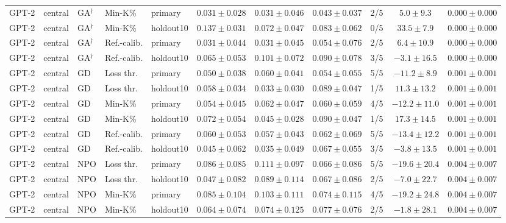 {\begin{longtable}{@{\extracolsep{\fill}}lllllcccccc@{}}
GPT-2 & central & GA$^{\dagger}$ & Min-K\% & primary & $0.031 \pm 0.028$ & $0.031 \pm 0.046$ & $0.043 \pm 0.037$ & 2/5 & $5.0 \pm 9.3$ & $0.000 \pm 0.000$ \\
GPT-2 & central & GA$^{\dagger}$ & Min-K\% & holdout10 & $0.137 \pm 0.031$ & $0.072 \pm 0.047$ & $0.083 \pm 0.062$ & 0/5 & $33.5 \pm 7.9$ & $0.000 \pm 0.000$ \\
GPT-2 & central & GA$^{\dagger}$ & Ref.-calib. & primary & $0.031 \pm 0.044$ & $0.031 \pm 0.045$ & $0.054 \pm 0.076$ & 2/5 & $6.4 \pm 10.9$ & $0.000 \pm 0.000$ \\
GPT-2 & central & GA$^{\dagger}$ & Ref.-calib. & holdout10 & $0.065 \pm 0.053$ & $0.101 \pm 0.072$ & $0.090 \pm 0.078$ & 3/5 & $-3.1 \pm 16.5$ & $0.000 \pm 0.000$ \\
GPT-2 & central & GD & Loss thr. & primary & $0.050 \pm 0.038$ & $0.060 \pm 0.041$ & $0.054 \pm 0.055$ & 5/5 & $-11.2 \pm 8.9$ & $0.001 \pm 0.001$ \\
GPT-2 & central & GD & Loss thr. & holdout10 & $0.058 \pm 0.034$ & $0.033 \pm 0.030$ & $0.089 \pm 0.047$ & 1/5 & $11.3 \pm 13.2$ & $0.001 \pm 0.001$ \\
GPT-2 & central & GD & Min-K\% & primary & $0.054 \pm 0.045$ & $0.062 \pm 0.047$ & $0.060 \pm 0.059$ & 4/5 & $-12.2 \pm 11.0$ & $0.001 \pm 0.001$ \\
GPT-2 & central & GD & Min-K\% & holdout10 & $0.072 \pm 0.054$ & $0.045 \pm 0.028$ & $0.090 \pm 0.047$ & 1/5 & $17.3 \pm 14.5$ & $0.001 \pm 0.001$ \\
GPT-2 & central & GD & Ref.-calib. & primary & $0.060 \pm 0.053$ & $0.057 \pm 0.043$ & $0.062 \pm 0.069$ & 5/5 & $-13.4 \pm 12.2$ & $0.001 \pm 0.001$ \\
GPT-2 & central & GD & Ref.-calib. & holdout10 & $0.045 \pm 0.062$ & $0.035 \pm 0.049$ & $0.067 \pm 0.055$ & 3/5 & $-3.8 \pm 13.5$ & $0.001 \pm 0.001$ \\
GPT-2 & central & NPO & Loss thr. & primary & $0.086 \pm 0.085$ & $0.111 \pm 0.097$ & $0.066 \pm 0.086$ & 5/5 & $-19.6 \pm 20.4$ & $0.004 \pm 0.007$ \\
GPT-2 & central & NPO & Loss thr. & holdout10 & $0.047 \pm 0.082$ & $0.089 \pm 0.114$ & $0.067 \pm 0.086$ & 2/5 & $-7.0 \pm 22.7$ & $0.004 \pm 0.007$ \\
GPT-2 & central & NPO & Min-K\% & primary & $0.085 \pm 0.104$ & $0.103 \pm 0.111$ & $0.074 \pm 0.115$ & 4/5 & $-19.2 \pm 24.8$ & $0.004 \pm 0.007$ \\
GPT-2 & central & NPO & Min-K\% & holdout10 & $0.064 \pm 0.074$ & $0.074 \pm 0.125$ & $0.077 \pm 0.076$ & 2/5 & $-1.8 \pm 28.1$ & $0.004 \pm 0.007$ \\

\end{longtable}}
